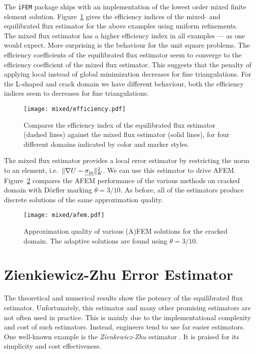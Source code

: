 \documentclass[thesis.tex]{subfiles}
\begin{document}
The \texttt{iFEM} package ships with an implementation of the lowest order mixed finite element solution. Figure~\ref{fig:effmixed} gives the efficiency
indices of the mixed- and equilibrated flux estimator for the above examples using uniform refinements. 
The mixed flux estimator has a higher efficiency index in all examples --- as one would expect. 
More surprising is the behaviour for the unit square problems. The efficiency coefficients of the equilibrated flux estimator
seem to  converge to the efficiency coefficient of the mixed flux estimator. This suggests that the penalty of applying
local instead of global minimization decreases for fine triangulations. For the L-shaped and crack domain we have different behaviour,
both the efficiency indices seem to decreases for fine triangulations. 
\begin{figure}
  \centering
  \texttt{[image: mixed/efficiency.pdf]}
  \caption{
    Compares the efficiency index of the equilibrated flux estimator (dashed lines) against the mixed flux estimator (solid lines), for
  four different domains indicated by color and marker styles.}
  \label{fig:effmixed}
\end{figure}

The mixed flux estimator provides a local error estimator by restricting the norm to an element, i.e.~$\| \nabla U - \underline{\sigma_m} \|^2_K$. We
can use this estimator to drive AFEM. Figure~\ref{fig:afemmixed} compares the AFEM performance of the various methods on cracked domain with D\"orfler
marking $\theta = 3/10$.  As before, all of the estimators produce discrete solutions of the same approximation quality. 
\begin{figure}
  \centering
  \texttt{[image: mixed/afem.pdf]}
  \caption{
    Approximation quality of various (A)FEM solutions for the cracked domain. The adaptive solutions are found using $\theta = 3/10$.
  }
  \label{fig:afemmixed}
\end{figure}
\section{Zienkiewicz-Zhu Error Estimator}
The theoretical and numerical results show the potency of the equilibrated flux estimator. Unfortunately, this estimator and many other promising
estimators are not often used in practice. This is mainly due to the implementational complexity and cost of such estimators.
Instead, engineers tend to use far easier estimators. One well-known example is the \emph{Zienkewicz-Zhu} estimator 
\cite{zienkiewicz1987simple, zienkiewicz1992superconvergent}. It is praised for its simplicity and cost effectiveness.
\end{document}
